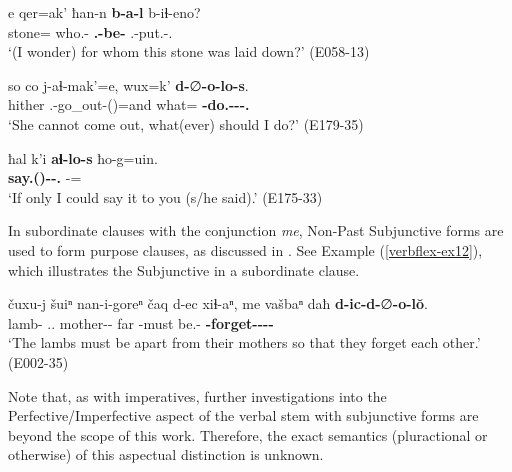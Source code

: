 \begin{exe}
	\ex\label{verbflex-ex11}
	\begin{xlist}
		
		\ex\label{verbflex-ex11a}
		\gll e qer=ak' ħan-n \textbf{b-a-l} b-iɬ-eno? \\
		{\Prox} stone={\Indf} who.{\Obl}-{\Dat} \textbf{{\B}.{\Sg}-be-{\Sbjv}} {\B}.{\Sg}-put.{\Pfv}-{\Ptcp}.{\Pst} \\
		\trans `(I wonder) for whom this stone was laid down?'
		\hfill (E058-13)
		
		\ex\label{verbflex-ex11b}
		\gll so co j-aɬ-mak'=e, wux=k' \textbf{d-}∅\textbf{-o-lo-s}. \\
		hither {\Neg} {\F}.{\Sg}-go\_out-{\Pot}({\Npst})=and what={\Indf} \textbf{{\D}-do.{\Pfv}-{\Npst}-{\Sbjv}-{\Fsg}.{\Erg}} \\
		\trans `She cannot come out, what(ever) should I do?'
		\hfill (E179-35)
		
		\ex\label{verbflex-ex11c}
		\gll ħal k'i \textbf{aɬ-lo-s} ħo-g=uin.  \\
		{\Pv} {\Contr} \textbf{say.{\Pfv}({\Npst})-{\Sbjv}-{\Fsg}.{\Erg}} {\Ssg}-{\All}={\Quot}  \\
		\trans `If only I could say it to you (s/he said).'
		\hfill (E175-33)
		
	\end{xlist}
\end{exe}

In subordinate clauses with the conjunction \textit{me}, Non-Past Subjunctive forms are used to form purpose clauses, as discussed in . See Example (\ref{verbflex-ex12}), which illustrates the Subjunctive in a subordinate clause.


	\begin{exe}
		\ex\label{verbflex-ex12}
		\gll  čuxu-j šuiⁿ nan-i-goreⁿ čaq d-ec xiɬ-aⁿ, me vašbaⁿ daħ \textbf{d-ic-d-}∅\textbf{-o-l\u{o}}. \\
		lamb-{\Pl} {\Refl}.{\Poss}.{\Pl} mother-{\Pl}-{\Adabl} far {\D}-must be.{\Pfv}-{\Inf} {\Subord} {\Recp} {\Pv} \textbf{{\D}-forget-{\D}-{\Tr}-{\Npst}-{\Sbjv}} \\
		\trans `The lambs must be apart from their mothers so that they forget each other.'
		\hfill (E002-35)
	\end{exe}


Note that, as with imperatives, further investigations into the Perfective/Imperfective aspect of the verbal stem with subjunctive forms are beyond the scope of this work. Therefore, the exact semantics (pluractional or otherwise) of this aspectual distinction is unknown. 




